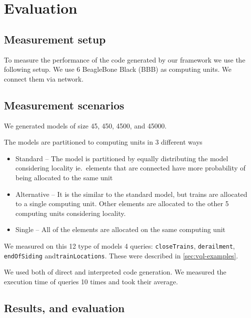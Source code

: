 
\chapter{Evaluation}


\section{Measurement setup}

To measure the performance of the code generated by our framework we use the following setup.
We use 6 BeagleBone Black (BBB) \cite{BBB} as computing units. 
We connect them via network. 


\section{Measurement scenarios}

We generated models of size 45, 450, 4500, and 45000.

The models are partitioned to computing units in 3 different ways 
\begin{itemize}
	\item Standard -- The model is partitioned by equally distributing the model considering locality ie.\ elements that are connected have more probability of being allocated to the same unit
	\item Alternative -- It is the similar to the standard model, but trains are allocated to a single computing unit. Other elements are allocated to the other 5 computing units considering locality.
	\item Single -- All of the elements are allocated on the same computing unit
\end{itemize}

We measured on this 12 type of models 4 queries: \texttt{closeTrains}, \texttt{derailment}, \texttt{endOfSiding} and\texttt{trainLocations}. 
These were described in \autoref{sec:vql-examples}.

We used both of direct and interpreted code generation.
We measured the execution time of queries 10 times and took their average.

\section{Results, and evaluation}

